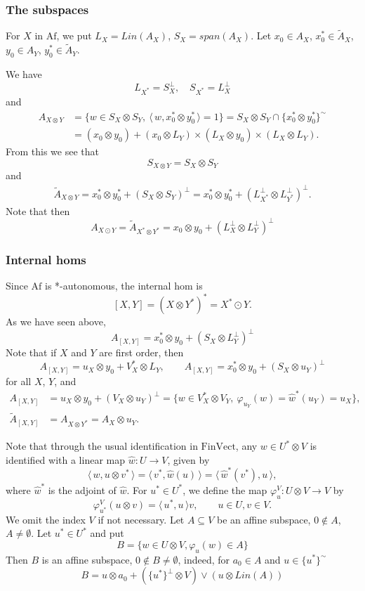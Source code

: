 \documentclass[12pt]{article}
\theoremstyle{definition}
\theoremstyle{remark}
\def\<{\langle\,}
\def\>{\,\rangle}
\def \Af{\mathrm{Af}}
\def \FV{\mathrm{FinVect}}
\def\bX{ X}
\def\bY{ Y}
\begin{document}
\subsubsection{The subspaces}

For $\bX$ in $\Af$, we put $L_\bX=Lin(A_\bX)$, $S_\bX=span(A_\bX)$. Let $x_0\in A_\bX$,
$x_0^*\in \tilde A_\bX$, $y_0\in A_\bY$, $y_0^*\in \tilde A_\bY$.

We have
\[
L_{\bX^*}=S_\bX^\perp,\quad S_{\bX^*}=L_\bX^\perp
\]
and
\begin{align*}
A_{\bX\otimes \bY}&=\{w\in S_\bX\otimes S_\bY,\ \<w,x_0^*\otimes y_0^*\>=1\}=S_\bX\otimes
S_\bY\cap \{x_0^*\otimes y_0^*\}^\sim\\
&= (x_0\otimes y_0)+ (x_0\otimes L_\bY)\times (L_\bX\otimes y_0)\times  (L_\bX\otimes L_\bY).
\end{align*}
From this we see that 
\[
S_{\bX\otimes \bY}=S_\bX\otimes S_\bY
\]
and 
\begin{align*}
\tilde A_{\bX\otimes \bY}= x_0^*\otimes y_0^*+(S_\bX\otimes S_\bY)^\perp=x_0^*\otimes
y_0^*+(L_{\bX^*}^\perp\otimes L_{\bY^*}^\perp)^\perp.
\end{align*}
Note that then
\[
A_{\bX\odot \bY}=\tilde A_{\bX^*\otimes \bY^*}=x_0\otimes y_0+ (L_{\bX}^\perp\otimes L_{\bY}^\perp)^\perp
\]
\subsubsection{Internal homs}

Since $\Af$ is *-autonomous, the internal hom is 
\[
[\bX,\bY]=(\bX\otimes \bY^*)^*=\bX^*\odot \bY.
\]
As we have seen above, 
\[
A_{[\bX,\bY]}=x_0^*\otimes y_0+(S_{\bX}\otimes L_{\bY}^\perp)^\perp
\]
Note that if $X$ and $Y$ are  first order, then
\[
A_{[X,\bY]}=u_X\otimes y_0+V_X^*\otimes L_\bY,\qquad A_{[\bX,Y]}=x_0^*\otimes
y_0+(S_\bX\otimes u_Y)^\perp
\]
for all $\bX$, $\bY$, and
\begin{align*}
A_{[X,Y]}&=u_X\otimes y_0+(V_X\otimes u_Y)^\perp=\{w\in V_X^*\otimes V_Y,\
\varphi_{u_Y}(w)=\hat w^*(u_Y)=u_X\},\\
\tilde A_{[X,Y]}&=A_{X\otimes Y^*}=A_X\otimes u_Y.
\end{align*}

Note that through the usual identification in $\FV$, any $w\in U^*\otimes V$ is
identified with a linear map $\hat w:U\to V$, given by
\[
\<w,u\otimes v^*\>=\<v^*,\hat w(u)\>=\<\hat w^*(v^*),u\>,
\]
where $\hat w^*$ is the adjoint of $\hat w$. For $u^*\in U^*$, we define the map $\varphi^V_u:
U\otimes V\to V$ by
\[
\varphi^V_{u^*}(u\otimes v)= \<u^*,u\>v,\qquad u\in U, v\in V. 
\]
We omit the index $V$ if not necessary. 
Let $A\subseteq V$ be an affine subspace, $0\notin A$, $A\ne \emptyset$. Let $u^*\in U^*$ and put 
\[
B=\{w\in U\otimes V, \varphi_u(w)\in A\}
\]
Then $B$ is an affine subspace, $0\notin B\ne\emptyset$, indeed, for $a_0\in A$ and $u\in \{u^*\}^\sim$
\[
B=u\otimes a_0+ (\{u^*\}^\perp\otimes V)\vee (u\otimes Lin(A))
\]
\end{document}
